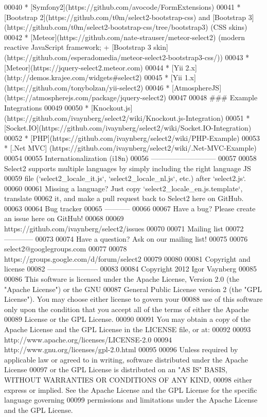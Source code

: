 \begin{DoxyCode}
00040 * [Symfony2](https:\textcolor{comment}{//github.com/avocode/FormExtensions)}
00041 * [Bootstrap 2](https:\textcolor{comment}{//github.com/t0m/select2-bootstrap-css) and [Bootstrap
       3](https://github.com/t0m/select2-bootstrap-css/tree/bootstrap3) (CSS skins)}
00042 * [Meteor](https:\textcolor{comment}{//github.com/nate-strauser/meteor-select2) (modern reactive JavaScript framework; +
       [Bootstrap 3 skin](https://github.com/esperadomedia/meteor-select2-bootstrap3-css/))}
00043 * [Meteor](https:\textcolor{comment}{//jquery-select2.meteor.com)}
00044 * [Yii 2.x](http:\textcolor{comment}{//demos.krajee.com/widgets#select2)}
00045 * [Yii 1.x](https:\textcolor{comment}{//github.com/tonybolzan/yii-select2)}
00046 * [AtmosphereJS](https:\textcolor{comment}{//atmospherejs.com/package/jquery-select2)}
00047 
00048 \textcolor{preprocessor}{### Example Integrations}
00049 \textcolor{preprocessor}{}
00050 * [Knockout.js](https:\textcolor{comment}{//github.com/ivaynberg/select2/wiki/Knockout.js-Integration)}
00051 * [Socket.IO](https:\textcolor{comment}{//github.com/ivaynberg/select2/wiki/Socket.IO-Integration)}
00052 * [PHP](https:\textcolor{comment}{//github.com/ivaynberg/select2/wiki/PHP-Example)}
00053 * [.Net MVC] (https:\textcolor{comment}{//github.com/ivaynberg/select2/wiki/.Net-MVC-Example)}
00054 
00055 Internationalization (i18n)
00056 ---------------------------
00057 
00058 Select2 supports multiple languages by simply including the right language JS
00059 file (`select2\_locale\_it.js`, `select2\_locale\_nl.js`, etc.) after `select2.js`.
00060 
00061 Missing a language? Just copy `select2\_locale\_en.js.template`, translate
00062 it, and make a pull request back to Select2 here on GitHub.
00063 
00064 Bug tracker
00065 -----------
00066 
00067 Have a bug? Please create an issue here on GitHub!
00068 
00069 https:\textcolor{comment}{//github.com/ivaynberg/select2/issues}
00070 
00071 Mailing list
00072 ------------
00073 
00074 Have a question? Ask on our mailing list!
00075 
00076 select2@googlegroups.com
00077 
00078 https:\textcolor{comment}{//groups.google.com/d/forum/select2}
00079 
00080 
00081 Copyright and license
00082 ---------------------
00083 
00084 Copyright 2012 Igor Vaynberg
00085 
00086 This software is licensed under the Apache License, Version 2.0 (the "Apache License") or the GNU
00087 General Public License version 2 (the "GPL License"). You may choose either license to govern your
00088 use of this software only upon the condition that you accept all of the terms of either the Apache
00089 License or the GPL License.
00090 
00091 You may obtain a copy of the Apache License and the GPL License in the LICENSE file, or at:
00092 
00093 http:\textcolor{comment}{//www.apache.org/licenses/LICENSE-2.0}
00094 http:\textcolor{comment}{//www.gnu.org/licenses/gpl-2.0.html}
00095 
00096 Unless required by applicable law or agreed to in writing, software distributed under the Apache License
00097 or the GPL License is distributed on an "AS IS" BASIS, WITHOUT WARRANTIES OR CONDITIONS OF ANY KIND,
00098 either express or implied. See the Apache License and the GPL License for the specific language governing
00099 permissions and limitations under the Apache License and the GPL License.
\end{DoxyCode}
